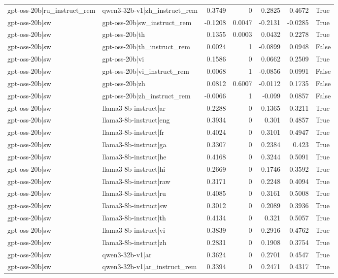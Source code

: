 \begin{table}
\begin{tabular}{l l r r r r l}
gpt-oss-20b|ru_instruct_rem & qwen3-32b-v1|zh_instruct_rem & 0.3749 & 0 & 0.2825 & 0.4672 & True \\
gpt-oss-20b|sw & gpt-oss-20b|sw_instruct_rem & -0.1208 & 0.0047 & -0.2131 & -0.0285 & True \\
gpt-oss-20b|sw & gpt-oss-20b|th & 0.1355 & 0.0003 & 0.0432 & 0.2278 & True \\
gpt-oss-20b|sw & gpt-oss-20b|th_instruct_rem & 0.0024 & 1 & -0.0899 & 0.0948 & False \\
gpt-oss-20b|sw & gpt-oss-20b|vi & 0.1586 & 0 & 0.0662 & 0.2509 & True \\
gpt-oss-20b|sw & gpt-oss-20b|vi_instruct_rem & 0.0068 & 1 & -0.0856 & 0.0991 & False \\
gpt-oss-20b|sw & gpt-oss-20b|zh & 0.0812 & 0.6007 & -0.0112 & 0.1735 & False \\
gpt-oss-20b|sw & gpt-oss-20b|zh_instruct_rem & -0.0066 & 1 & -0.099 & 0.0857 & False \\
gpt-oss-20b|sw & llama3-8b-instruct|ar & 0.2288 & 0 & 0.1365 & 0.3211 & True \\
gpt-oss-20b|sw & llama3-8b-instruct|eng & 0.3934 & 0 & 0.301 & 0.4857 & True \\
gpt-oss-20b|sw & llama3-8b-instruct|fr & 0.4024 & 0 & 0.3101 & 0.4947 & True \\
gpt-oss-20b|sw & llama3-8b-instruct|ga & 0.3307 & 0 & 0.2384 & 0.423 & True \\
gpt-oss-20b|sw & llama3-8b-instruct|he & 0.4168 & 0 & 0.3244 & 0.5091 & True \\
gpt-oss-20b|sw & llama3-8b-instruct|hi & 0.2669 & 0 & 0.1746 & 0.3592 & True \\
gpt-oss-20b|sw & llama3-8b-instruct|raw & 0.3171 & 0 & 0.2248 & 0.4094 & True \\
gpt-oss-20b|sw & llama3-8b-instruct|ru & 0.4085 & 0 & 0.3161 & 0.5008 & True \\
gpt-oss-20b|sw & llama3-8b-instruct|sw & 0.3012 & 0 & 0.2089 & 0.3936 & True \\
gpt-oss-20b|sw & llama3-8b-instruct|th & 0.4134 & 0 & 0.321 & 0.5057 & True \\
gpt-oss-20b|sw & llama3-8b-instruct|vi & 0.3839 & 0 & 0.2916 & 0.4762 & True \\
gpt-oss-20b|sw & llama3-8b-instruct|zh & 0.2831 & 0 & 0.1908 & 0.3754 & True \\
gpt-oss-20b|sw & qwen3-32b-v1|ar & 0.3624 & 0 & 0.2701 & 0.4547 & True \\
gpt-oss-20b|sw & qwen3-32b-v1|ar_instruct_rem & 0.3394 & 0 & 0.2471 & 0.4317 & True \\

\end{tabular}
\end{table}
